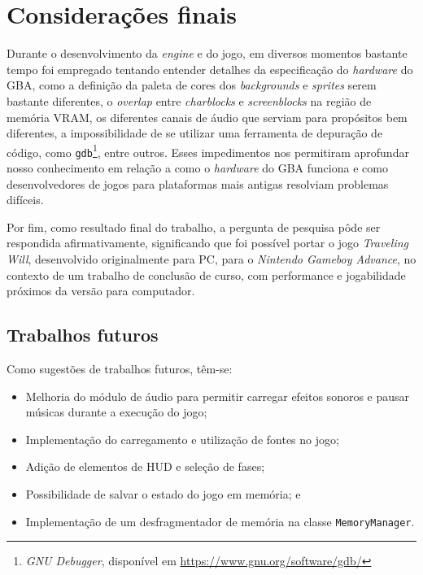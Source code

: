 \chapter[Considerações finais]{Considerações finais}

Durante o desenvolvimento da \textit{engine} e do jogo, em diversos momentos bastante tempo foi empregado tentando entender detalhes da especificação do \textit{hardware} do GBA, como a definição da paleta de cores dos \textit{backgrounds} e \textit{sprites} serem bastante diferentes, o \textit{overlap} entre \textit{charblocks} e \textit{screenblocks} na região de memória VRAM, os diferentes canais de áudio que serviam para propósitos bem diferentes, a impossibilidade de se utilizar uma ferramenta de depuração de código, como \texttt{gdb}\footnote{\textit{GNU Debugger}, disponível em \url{https://www.gnu.org/software/gdb/}}, entre outros. Esses impedimentos nos permitiram aprofundar nosso conhecimento em relação a como o \textit{hardware} do GBA funciona e como desenvolvedores de jogos para plataformas mais antigas resolviam problemas difíceis.

Por fim, como resultado final do trabalho, a pergunta de pesquisa pôde ser respondida afirmativamente, significando que foi possível portar o jogo \textit{Traveling Will}, desenvolvido originalmente para PC, para o \textit{Nintendo Gameboy Advance}, no contexto de um trabalho de conclusão de curso, com performance e jogabilidade próximos da versão para computador.

\section{Trabalhos futuros}

  Como sugestões de trabalhos futuros, têm-se:

  \begin{itemize}
    \item Melhoria do módulo de áudio para permitir carregar efeitos sonoros e pausar músicas durante a execução do jogo;
    \item Implementação do carregamento e utilização de fontes no jogo;
    \item Adição de elementos de HUD e seleção de fases;
    \item Possibilidade de salvar o estado do jogo em memória; e
    \item Implementação de um desfragmentador de memória na classe \texttt{MemoryManager}.
  \end{itemize}